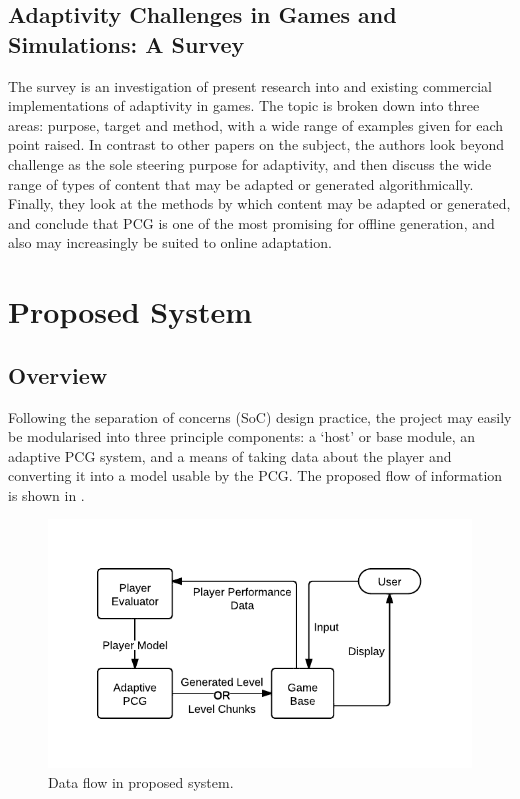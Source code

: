 \documentclass[a4paper,oneside,12pt,openany]{memoir}
\begin{document}
\section{Adaptivity Challenges in Games and Simulations: A Survey}
The survey is an investigation of present research into and existing commercial implementations of adaptivity in games. The topic is broken down into three areas: purpose, target and method, with a wide range of examples given for each point raised. In contrast to other papers on the subject, the authors look beyond challenge as the sole steering purpose for adaptivity, and then discuss the wide range of types of content that may be adapted or generated algorithmically. Finally, they look at the methods by which content may be adapted or generated, and conclude that PCG is one of the most promising for offline generation, and also may increasingly be suited to online adaptation.
\cite{5765665}


\chapter{Proposed System}
\section{Overview}
Following the separation of concerns (SoC) design practice, the project may easily be modularised into three principle components: a `host' or base module, an adaptive PCG system, and a means of taking data about the player and converting it into a model usable by the PCG. The proposed flow of information is shown in .

\begin{figure}[htbp]
  \centering
  \includegraphics[trim = 10mm 12mm 10mm 12mm, clip]{system}
  \caption{Data flow in proposed system.}
  \label{Figure:dataflow}
\end{figure}
\end{document}
